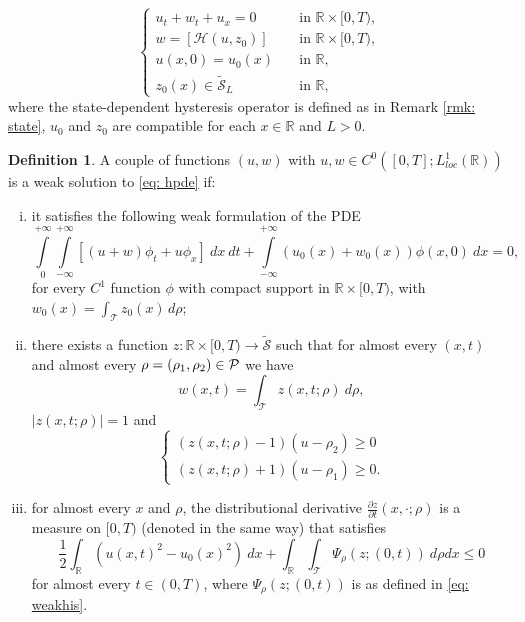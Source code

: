 \documentclass[12pt]{article}
\newcommand{\R}{\mathbb{R}}
\newcommand{\HM}{\mathcal{H}}
\newcommand{\T}{\mathcal{T}}
\newcommand{\p}{\rho}
\newcommand{\1}{\mathds{1}}
\theoremstyle{definition}
\newtheorem{defi}[teo]{Definition}
\begin{document}
\begin{equation}\label{eq: hpde}
    \begin{cases}
        u_t+w_t+u_x=0\quad &\text{in } \R \times [0,T),\\
        w=[\HM(u,z_0)] \quad &\text{in } \R \times [0,T),\\
        u(x,0)=u_0(x) \quad &\text{in } \R ,\\
        z_0(x) \in \tilde{\mathcal S}_L\quad &\text{in } \R,
    \end{cases}
\end{equation} where the state-dependent hysteresis operator is defined as in Remark \ref{rmk: state}, $u_0$ and $z_0$ are compatible for each $x\in \R$ and $L>0$.


\begin{defi}\label{def: weak}
    A couple of functions $(u,w)$ with $u,w \in C^0([0,T];L^1_{loc}(\R))$ is a weak solution to \eqref{eq: hpde} if: \begin{enumerate}[i)]
    \item it satisfies the following weak formulation of the PDE \begin{equation}\label{eq: hweaksol}
        \int\limits_0^{+\infty} \int\limits_{-\infty }^{+\infty}[(u+w) \phi_t+u \phi_x] ~dx~ dt +\int\limits_{-\infty}^{+\infty} (u_0(x) +w_0(x))\phi(x,0) ~dx=0,
    \end{equation} for every $C^1$ function $\phi$ with compact support in $\R \times [0,T)$, with $w_0(x)= \int_\T z_0(x)\,d\p;$
    \item there exists a function $z: \R \times [0,T) \to \tilde{\mathcal S}$ such that for almost every $(x,t)$ and almost every $\p=(\p_1,\p_2)\in{\cal P}$ we have \begin{equation}\label{eq: def11}
        w(x,t) = \int_{\T} z (x,t;\p) ~d\p,
    \end{equation}$|z(x,t;\p)|=1$ and \begin{equation}\label{eq: hdis}
            \begin{cases}
                (z(x,t; \p)-1)(u-\p_2) \geq 0 \\
                (z(x,t;\p)+1)(u-\p_1) \geq 0.
            \end{cases}
        \end{equation}  
    \item for almost every $x$ and $\p$, the distributional derivative $\frac{\partial z }{\partial t} (x, \cdot; \p)$ is a measure on $[0,T)$ (denoted in the same way) that satisfies \begin{equation}
        \label{eq: genweakhis}
        \frac{1}{2}\int_\R (u(x,t)^2-u_0(x)^2)~dx+\int_\R \int_\T \Psi_\p(z; (0,t)) ~d\p dx \leq 0
        \end{equation}  for almost every $t\in (0,T)$, where $\Psi_\p(z;(0,t))$ is as defined in \eqref{eq: weakhis}.
\end{enumerate}
\end{defi}
\end{document}
